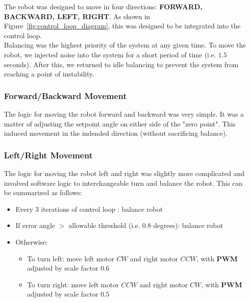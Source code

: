 \documentclass{article}
\begin{document}
\begin{minipage}{\linewidth}
    The robot was designed to move in four directions: \textbf{FORWARD, BACKWARD, LEFT, RIGHT}.
    As shown in Figure~\ref{fig:control_loop_diagram}, this was designed to be integrated into the control loop.  \\

    Balancing was the highest priority of the system at any given time. To move the robot, we injected noise into the system for a short period of time
    (i.e. $1.5$ seconds). After this, we returned to idle balancing to prevent the system from reaching a point of instability. \\
\end{minipage}

\subsubsection{Forward/Backward Movement}

\begin{minipage}{\linewidth}
    The logic for moving the robot forward and backward was very simple. It was a matter of adjusting the setpoint angle on either side of the "zero point".
    This induced movement in the indended direction (without sacrificing balance). \\
\end{minipage}

\subsubsection{Left/Right Movement}

\begin{minipage}{\linewidth}
    The logic for moving the robot left and right was slightly more complicated and involved
    software logic to interchangeable turn and balance the robot. This can be summarized as follows: \\
\end{minipage}

\begin{itemize}
    \item Every 3 iterations of control loop : balance robot
    \item If error angle $>$ allowable threshold (i.e. 0.8 degrees): balance robot
    \item Otherwise:
    \begin{itemize}
        \item To turn left: move left motor $CW$ and right motor $CCW$, with \textbf{PWM} adjusted by scale factor $0.6$
        \item To turn right: move left motor $CCW$ and right motor $CW$,  with \textbf{PWM} adjusted by scale factor $0.5$
    \end{itemize}
\end{itemize}
\end{document}
